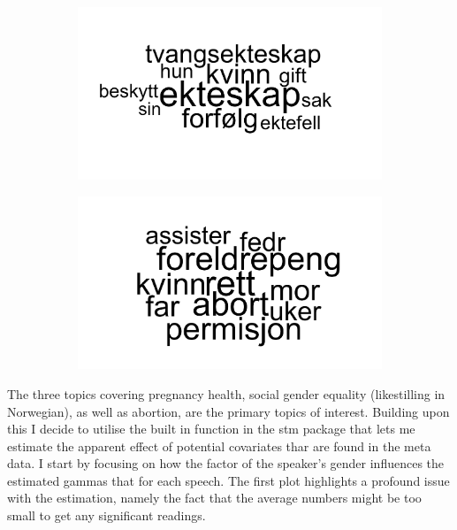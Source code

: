 \documentclass[12pt]{article}
\begin{document}
	\begin{figure}[h]
		\centering
		\begin{subfigure}{0.45\linewidth}
			\includegraphics[scale=0.40]{topic158wordcloud.png}
		\end{subfigure}
	\begin{subfigure}{0.45\linewidth}
		\includegraphics[scale=0.40]{topic164wordcloud.png}
	\end{subfigure}
	\end{figure}
	
	The three topics covering pregnancy health, social gender equality (likestilling in Norwegian), as well as abortion, are the primary topics of interest. Building upon this I decide to utilise the built in function in the stm package that lets me estimate the apparent effect of potential covariates thar are found in the meta data. I start by focusing on how the factor of the speaker's gender influences the estimated gammas that for each speech. The first plot highlights a profound issue with the estimation, namely the fact that the average numbers might be too small to get any significant readings. 
	
\end{document}
